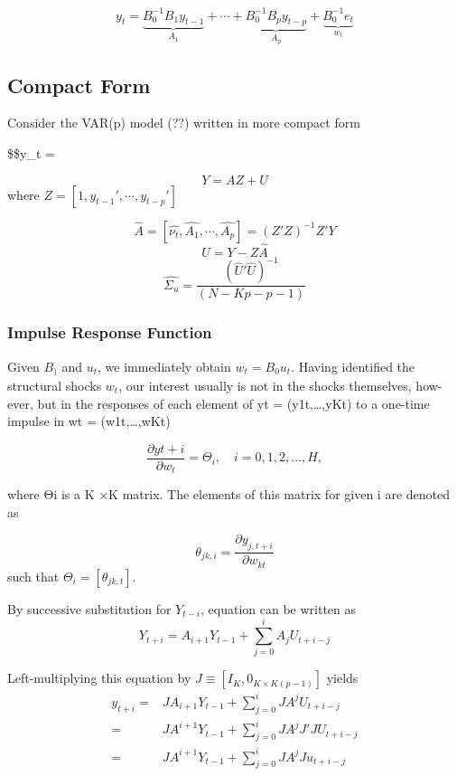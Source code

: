 \documentclass[
]{article}
\begin{document}
\[y_{t}= \underbrace{B_0^{-1}B_{1}y_{{t-1}}}_{A_1} + \cdots + \underbrace{B_0^{-1}B_{p}y_{{t-p}}}_{A_p} + \underbrace{B_0^{-1}e_{t}}_{w_t}\]

\hypertarget{compact-form}{%
\subsection{Compact Form}\label{compact-form}}

Consider the VAR(p) model (??) written in more compact form

\$\$y\_t =

\[Y = AZ + U\]
where \(Z = [1, y_{t-1}', \cdots, y_{t-p}']\)

\[\hat{A} = [\hat{\nu_t}, \hat{A_1}, \cdots, \hat{A_p}] = (Z'Z)^{-1}Z'Y\]
\[\hat{U} = Y - Z\hat{A}\]
\[\hat{\Sigma_u} = \dfrac{(\hat{U}' \hat{U})^{-1}}{(N-Kp-p-1)}\]

\hypertarget{impulse-response-function}{%
\subsubsection{Impulse Response Function}\label{impulse-response-function}}

Given \(B_)\) and \(u_t\), we immediately obtain \(w_t = B_0u_t\). Having identified the
structural shocks \(w_t\), our interest usually is not in the shocks themselves, how-
ever, but in the responses of each element of yt = (y1t,\ldots,yKt) to a one-time
impulse in wt = (w1t,\ldots,wKt)

\[\dfrac{∂yt+i}{∂w_t} = \Theta_i, \quad i = 0, 1, 2, . . . , H, \]

where Θi is a K ×K matrix. The elements of this matrix for given i are denoted as

\[ θ_{jk,i} = \dfrac{∂y_{j,t+i}}{∂w_{kt}} \]
such that \(\Theta_i = [\theta_{jk,t}].\)

By successive substitution for \(Y_{t−i}\), equation can be written as
\[ Y_{t+i} = A_{i+1}Y_{t−1} + \sum^i_{j=0} A_jU_{t+i−j}\]

Left-multiplying this equation by \(J ≡ [I_K, 0_{K×K(p−1)}]\) yields
\begin{align}
y_{t+i} = & JA_{i+1}Y_{t−1} + \sum^{i}_{j=0} JA^jU_{t+i−j} \\
        = & JA^{i+1}Y_{t−1} + \sum^i_{j=0} JA^{j}J'JU_{t+i−j} \\
        = & JA^{i+1}Y_{t−1} + \sum^i_{j=0} JA^{j}Ju_{t+i−j} \\
\end{align}
\end{document}
